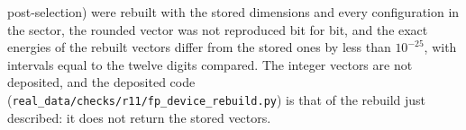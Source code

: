 \documentclass[aps,prx,onecolumn,10pt,nofootinbib,longbibliography,floatfix]{revtex4-2}
\theoremstyle{remark}
\begin{document}
post-selection) were rebuilt with the stored dimensions and every configuration in the sector, the rounded vector was not reproduced bit for bit, and the exact energies of
the rebuilt vectors differ from the stored ones by less than $10^{-25}$, with intervals equal to the twelve digits %
compared. The integer vectors are not deposited, and the deposited code
(\texttt{real\_data/checks/r11/fp\_device\_rebuild.py}) is that of the rebuild just described: it does not return
the stored vectors.
\needspace{160pt}%
\def\SMcap{Device labels at $J_z=4.0$ and $6.0$ with intervals proved in exact arithmetic.}\def\SMlab{tab:ft_c} %

\end{document}
